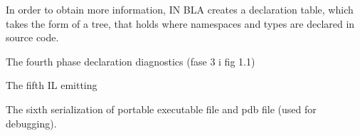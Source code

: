 

In order to obtain more information, IN BLA creates a declaration table, which takes the form of a tree, that holds where namespaces and types are declared in source code.
	





The fourth phase declaration diagnostics (fase 3 i fig 1.1)

The fifth IL emitting

The sixth serialization of portable executable file and pdb file (used for debugging).











